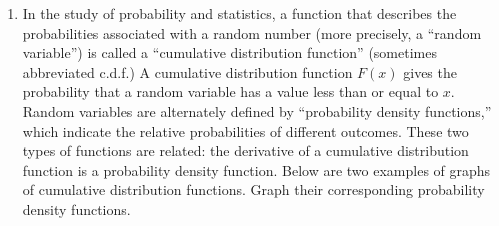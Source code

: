 \documentclass{article}
\begin{document}
\begin{itemize}
\begin{enumerate}
                 \item In the study of probability and statistics, a function that describes the probabilities associated with a random number (more precisely, a ``random variable'') is called a ``cumulative distribution function'' (sometimes abbreviated c.d.f.) A cumulative distribution function $F(x)$ gives the probability that a random variable has a value less than or equal to $x$. Random variables are alternately defined by ``probability density functions,'' which indicate the relative probabilities of different outcomes. These two types of functions are related: the derivative of a cumulative distribution function is a probability density function. Below are two examples of graphs of cumulative distribution functions. Graph their corresponding probability density functions.
                 
\begin{center}
\end{center}


\end{enumerate}
\end{itemize}
\end{document}

